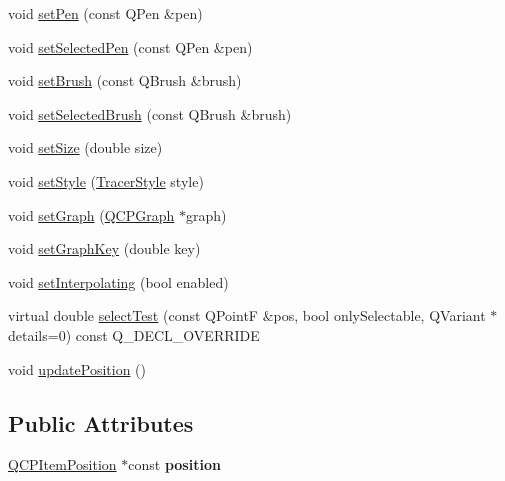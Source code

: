 \begin{DoxyCompactItemize}
void \hyperlink{classQCPItemTracer_af8048636fc1ef0152e51809b008df2ca}{set\+Pen} (const Q\+Pen \&pen)
\item 
void \hyperlink{classQCPItemTracer_ae1bf70db7f13f928660168cd3e5069f3}{set\+Selected\+Pen} (const Q\+Pen \&pen)
\item 
void \hyperlink{classQCPItemTracer_a2c303f7470a30084daa201ed556b3c36}{set\+Brush} (const Q\+Brush \&brush)
\item 
void \hyperlink{classQCPItemTracer_a0f55c084980a7a312af859d3e7b558ef}{set\+Selected\+Brush} (const Q\+Brush \&brush)
\item 
void \hyperlink{classQCPItemTracer_ae47fe0617f5fef5fdb766999569be10a}{set\+Size} (double size)
\item 
void \hyperlink{classQCPItemTracer_a41a2ac4f1acd7897b4e2a2579c03204e}{set\+Style} (\hyperlink{classQCPItemTracer_a2f05ddb13978036f902ca3ab47076500}{Tracer\+Style} style)
\item 
void \hyperlink{classQCPItemTracer_af5886f4ded8dd68cb4f3388f390790c0}{set\+Graph} (\hyperlink{classQCPGraph}{Q\+C\+P\+Graph} $\ast$graph)
\item 
void \hyperlink{classQCPItemTracer_a6840143b42f3b685cedf7c6d83a704c8}{set\+Graph\+Key} (double key)
\item 
void \hyperlink{classQCPItemTracer_a6c244a9d1175bef12b50afafd4f5fcd2}{set\+Interpolating} (bool enabled)
\item 
virtual double \hyperlink{classQCPItemTracer_a9fd955fea40e977d66f3a9fd5765aec4}{select\+Test} (const Q\+PointF \&pos, bool only\+Selectable, Q\+Variant $\ast$details=0) const Q\+\_\+\+D\+E\+C\+L\+\_\+\+O\+V\+E\+R\+R\+I\+DE
\item 
void \hyperlink{classQCPItemTracer_a5b90296109e36384aedbc8908a670413}{update\+Position} ()
\end{DoxyCompactItemize}
\subsection*{Public Attributes}
\begin{DoxyCompactItemize}
\item 
\mbox{\label{classQCPItemTracer_a69917e2fdb2b3a929c196958feee7cbe}} 
\hyperlink{classQCPItemPosition}{Q\+C\+P\+Item\+Position} $\ast$const {\bfseries position}
\end{DoxyCompactItemize}
